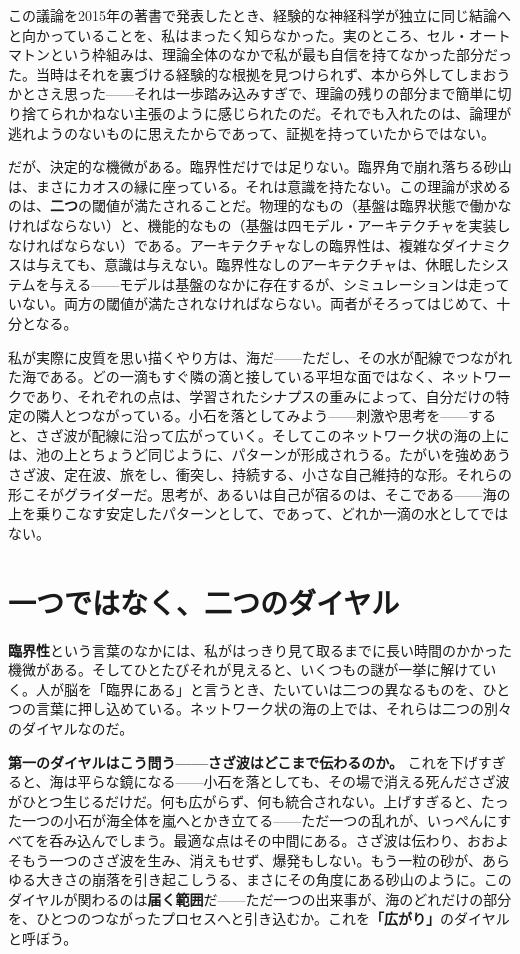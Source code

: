 \documentclass[11pt, twoside, openright]{book}
\begin{document}
この議論を2015年の著書で発表したとき、経験的な神経科学が独立に同じ結論へと向かっていることを、私はまったく知らなかった。実のところ、セル・オートマトンという枠組みは、理論全体のなかで私が最も自信を持てなかった部分だった。当時はそれを裏づける経験的な根拠を見つけられず、本から外してしまおうかとさえ思った------それは一歩踏み込みすぎで、理論の残りの部分まで簡単に切り捨てられかねない主張のように感じられたのだ。それでも入れたのは、論理が逃れようのないものに思えたからであって、証拠を持っていたからではない。

だが、決定的な機微がある。臨界性だけでは足りない。臨界角で崩れ落ちる砂山は、まさにカオスの縁に座っている。それは意識を持たない。この理論が求めるのは、\textbf{二つ}の閾値が満たされることだ。物理的なもの（基盤は臨界状態で働かなければならない）と、機能的なもの（基盤は四モデル・アーキテクチャを実装しなければならない）である。アーキテクチャなしの臨界性は、複雑なダイナミクスは与えても、意識は与えない。臨界性なしのアーキテクチャは、休眠したシステムを与える------モデルは基盤のなかに存在するが、シミュレーションは走っていない。両方の閾値が満たされなければならない。両者がそろってはじめて、十分となる。

私が実際に皮質を思い描くやり方は、海だ------ただし、その水が配線でつながれた海である。どの一滴もすぐ隣の滴と接している平坦な面ではなく、ネットワークであり、それぞれの点は、学習されたシナプスの重みによって、自分だけの特定の隣人とつながっている。小石を落としてみよう------刺激や思考を------すると、さざ波が配線に沿って広がっていく。そしてこのネットワーク状の海の上には、池の上とちょうど同じように、パターンが形成されうる。たがいを強めあうさざ波、定在波、旅をし、衝突し、持続する、小さな自己維持的な形。それらの形こそがグライダーだ。思考が、あるいは自己が宿るのは、そこである------海の上を乗りこなす安定したパターンとして、であって、どれか一滴の水としてではない。

\section*{一つではなく、二つのダイヤル}

\textbf{臨界性}という言葉のなかには、私がはっきり見て取るまでに長い時間のかかった機微がある。そしてひとたびそれが見えると、いくつもの謎が一挙に解けていく。人が脳を「臨界にある」と言うとき、たいていは二つの異なるものを、ひとつの言葉に押し込めている。ネットワーク状の海の上では、それらは二つの別々のダイヤルなのだ。

\textbf{第一のダイヤルはこう問う------さざ波はどこまで伝わるのか。} これを下げすぎると、海は平らな鏡になる------小石を落としても、その場で消える死んださざ波がひとつ生じるだけだ。何も広がらず、何も統合されない。上げすぎると、たった一つの小石が海全体を嵐へとかき立てる------ただ一つの乱れが、いっぺんにすべてを呑み込んでしまう。最適な点はその中間にある。さざ波は伝わり、おおよそもう一つのさざ波を生み、消えもせず、爆発もしない。もう一粒の砂が、あらゆる大きさの崩落を引き起こしうる、まさにその角度にある砂山のように。このダイヤルが関わるのは\textbf{届く範囲}だ------ただ一つの出来事が、海のどれだけの部分を、ひとつのつながったプロセスへと引き込むか。これを\textbf{「広がり」}のダイヤルと呼ぼう。
\end{document}
